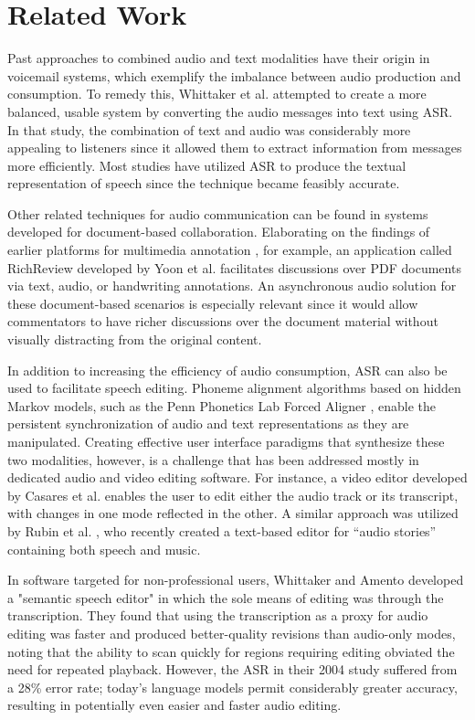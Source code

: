 \section{Related Work}
Past approaches to combined audio and text modalities have their origin in voicemail systems, which exemplify the imbalance between audio production and consumption. 
To remedy this, Whittaker et al. \cite{whittaker} attempted to create a more balanced, usable system by converting the audio messages into text using ASR. 
In that study, the combination of text and audio was considerably more appealing to listeners since it allowed them to extract information from messages more efficiently. 
Most studies have utilized ASR to produce the textual representation of speech since the technique became feasibly accurate.

Other related techniques for audio communication can be found in systems developed for document-based collaboration. 
Elaborating on the findings of earlier platforms for multimedia annotation \cite{bargeron}, for example, an application called RichReview developed by Yoon et al. \cite{yoon} facilitates discussions over PDF documents via text, audio, or handwriting annotations. 
An asynchronous audio solution for these document-based scenarios is especially relevant since it would allow commentators to have richer discussions over the document material without visually distracting from the original content. 

In addition to increasing the efficiency of audio consumption, ASR can also be used to facilitate speech editing. 
Phoneme alignment algorithms based on hidden Markov models, such as the Penn Phonetics Lab Forced Aligner \cite{p2fa}, enable the persistent synchronization of audio and text representations as they are manipulated. 
Creating effective user interface paradigms that synthesize these two modalities, however, is a challenge that has been addressed mostly in dedicated audio and video editing software. 
For instance, a video editor developed by Casares et al. \cite{casares} enables the user to edit either the audio track or its transcript, with changes in one mode reflected in the other. 
A similar approach was utilized by Rubin et al. \cite{rubin}, who recently created a text-based editor for ``audio stories'' containing both speech and music.

In software targeted for non-professional users, Whittaker and Amento \cite{whittaker_semantic} developed a "semantic speech editor" in which the sole means of editing was through the transcription. 
They found that using the transcription as a proxy for audio editing was faster and produced better-quality revisions than audio-only modes, noting that the ability to scan quickly for regions requiring editing obviated the need for repeated playback. 
However, the ASR in their 2004 study suffered from a 28\% error rate; today's language models permit considerably greater accuracy, resulting in potentially even easier and faster audio editing.